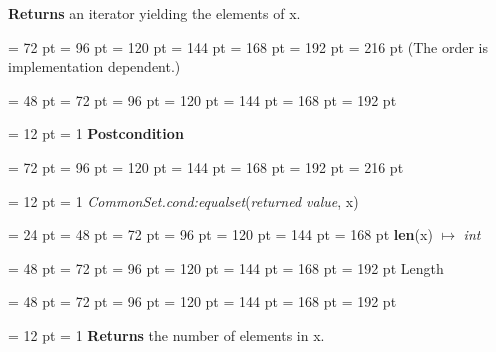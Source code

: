{{{{{{{\bf Returns \/}an iterator yielding the elements of x.\par}
{\par \noindent  \leftskip = 72 pt  \leftmargini = 96 pt  \leftmarginii = 120 pt  \leftmarginiii = 144 pt  \leftmarginiv = 168 pt  \leftmarginv = 192 pt  \leftmarginvi = 216 pt (The order is implementation dependent.)\par}
\par}
\par}
{\par \noindent  \leftskip = 48 pt  \leftmargini = 72 pt  \leftmarginii = 96 pt  \leftmarginiii = 120 pt  \leftmarginiv = 144 pt  \leftmarginv = 168 pt  \leftmarginvi = 192 pt {\par \noindent
{\par \pagebreak[3.100000] \noindent \hangindent = 12 pt \hangafter = 1 
{\bf Postcondition\/}\par}
{\par \noindent  \leftskip = 72 pt  \leftmargini = 96 pt  \leftmarginii = 120 pt  \leftmarginiii = 144 pt  \leftmarginiv = 168 pt  \leftmarginv = 192 pt  \leftmarginvi = 216 pt {\par \noindent
{\par \pagebreak[3.000000] \noindent \hangindent = 12 pt \hangafter = 1 
 {\em CommonSet.cond:equalset\/}({\em returned value\/}, x)\par}
\par}
\par}
\par}
\par}
\par}
\par}
{\par \noindent  \leftskip = 24 pt  \leftmargini = 48 pt  \leftmarginii = 72 pt  \leftmarginiii = 96 pt  \leftmarginiv = 120 pt  \leftmarginv = 144 pt  \leftmarginvi = 168 pt {\large {\bf len\/}}(x) \(\mapsto \)  {\em int\/}{\par \noindent
{\par \noindent  \leftskip = 48 pt  \leftmargini = 72 pt  \leftmarginii = 96 pt  \leftmarginiii = 120 pt  \leftmarginiv = 144 pt  \leftmarginv = 168 pt  \leftmarginvi = 192 pt  Length\par}
{\par \noindent  \leftskip = 48 pt  \leftmargini = 72 pt  \leftmarginii = 96 pt  \leftmarginiii = 120 pt  \leftmarginiv = 144 pt  \leftmarginv = 168 pt  \leftmarginvi = 192 pt {\par \noindent
{\par \pagebreak[3.100000] \noindent \hangindent = 12 pt \hangafter = 1 
{\bf Returns \/}the number of elements in x.
\par}
\par}
\par}
\par}
\par}
\par}
